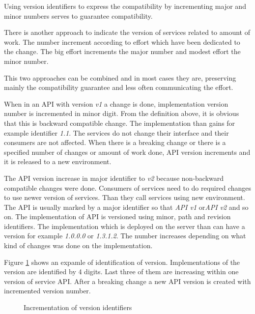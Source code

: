 Using version identifiers to express the compatibility by incrementing major and minor numbers serves to guarantee compatibility. 

There is another approach to indicate the version of services related to amount of work. The number increment according to effort which have been dedicated to the change. The big effort increments the major number and modest effort the minor number. 

This two approaches can be combined and in most cases they are, preserving mainly the compatibility guarantee and less often communicating the effort. \cite{soa-governance}

\bigskip

When in an API with version \emph{v1} a change is done, implementation version number is incremented in minor digit. From the definition above, it is obvious that this is backward compatible change. The implementation than gains for example identifier \emph{1.1}. The services do not change their interface and their consumers are not affected. 
When there is a breaking change or there is a specified number of changes or amount of work done, API version increments and it is released to a new environment. 

The API version increase in major identifier to \emph{v2} because non-backward compatible changes were done. Consumers of services need to do required changes to use newer version of services. Than they call services using new environment. 
The API is usually marked by a major identifier so that \emph{API v1} or\emph{API v2} and so on.
The implementation of API is versioned using minor, path and revision identifiers. The implementation which is deployed on the server than can have a version for example \emph{1.0.0.0} or \emph{1.3.1.2}. The number increases depending on what kind of changes was done on the implementation.

Figure \ref{fig:version-identifying} shows an expamle of identification of version. Implementations of the version are identified by 4 digits. Last three of them are increasing within one version of service API. After a breaking change a new API version is created with incremented version number. 

\begin{figure}[htp] 
\caption{Incrementation of version identifiers}
\label{fig:version-identifying}
\end{figure} 


